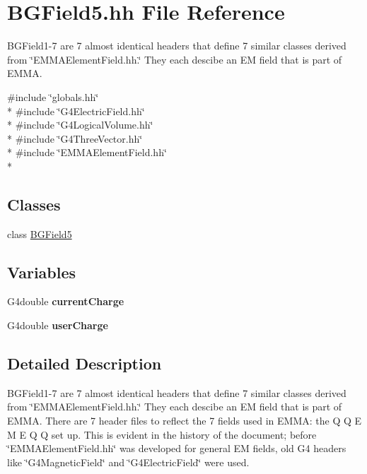 \hypertarget{BGField5_8hh}{\section{B\-G\-Field5.\-hh File Reference}
\label{BGField5_8hh}
}


B\-G\-Field1-\/7 are 7 almost identical headers that define 7 similar classes derived from \char`\"{}\-E\-M\-M\-A\-Element\-Field.\-hh.\char`\"{} They each descibe an E\-M field that is part of E\-M\-M\-A.  


{\ttfamily \#include \char`\"{}globals.\-hh\char`\"{}}\\*
{\ttfamily \#include \char`\"{}G4\-Electric\-Field.\-hh\char`\"{}}\\*
{\ttfamily \#include \char`\"{}G4\-Logical\-Volume.\-hh\char`\"{}}\\*
{\ttfamily \#include \char`\"{}G4\-Three\-Vector.\-hh\char`\"{}}\\*
{\ttfamily \#include \char`\"{}E\-M\-M\-A\-Element\-Field.\-hh\char`\"{}}\\*
\subsection*{Classes}
\begin{DoxyCompactItemize}
\item 
class \hyperlink{classBGField5}{B\-G\-Field5}
\end{DoxyCompactItemize}
\subsection*{Variables}
\begin{DoxyCompactItemize}
\item 
\hypertarget{BGField5_8hh_acb265d8eecfa1acd31056f0c7915362e}{G4double {\bfseries current\-Charge}}\label{BGField5_8hh_acb265d8eecfa1acd31056f0c7915362e}

\item 
\hypertarget{BGField5_8hh_a2d61cdd1b1b5ed409f7c91b54737c1b9}{G4double {\bfseries user\-Charge}}\label{BGField5_8hh_a2d61cdd1b1b5ed409f7c91b54737c1b9}

\end{DoxyCompactItemize}


\subsection{Detailed Description}
B\-G\-Field1-\/7 are 7 almost identical headers that define 7 similar classes derived from \char`\"{}\-E\-M\-M\-A\-Element\-Field.\-hh.\char`\"{} They each descibe an E\-M field that is part of E\-M\-M\-A. There are 7 header files to reflect the 7 fields used in E\-M\-M\-A\-: the Q Q E M E Q Q set up. This is evident in the history of the document; before \char`\"{}\-E\-M\-M\-A\-Element\-Field.\-hh\char`\"{} was developed for general E\-M fields, old G4 headers like \char`\"{}\-G4\-Magnetic\-Field\char`\"{} and \char`\"{}\-G4\-Electric\-Field\char`\"{} were used. 